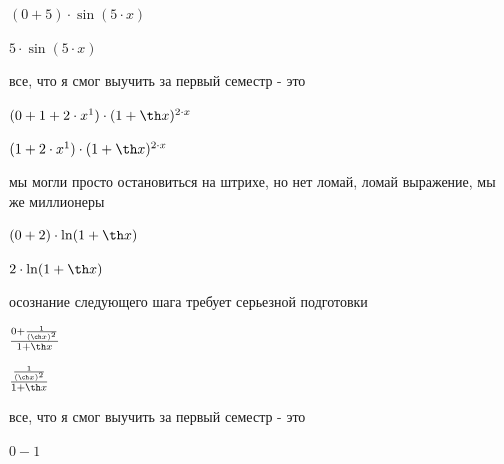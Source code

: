 \documentclass[a4paper,12pt]{article}
\begin{document}
\begin{center}$(0+5) \cdot  \sin (5 \cdot x)$

\end{center}



\begin{center}$5 \cdot  \sin (5 \cdot x)$

\end{center}

все, что я смог выучить за первый семестр - это 



\begin{center}$(0+1+2 \cdot x^{1}) \cdot (1+ \th x)^{2 \cdot x}$

\end{center}



\begin{center}$(1+2 \cdot x^{1}) \cdot (1+ \th x)^{2 \cdot x}$

\end{center}

мы могли просто остановиться на штрихе, но нет ломай, ломай выражение, мы же миллионеры 



\begin{center}$(0+2) \cdot  \ln (1+ \th x)$

\end{center}



\begin{center}$2 \cdot  \ln (1+ \th x)$

\end{center}

осознание следующего шага требует серьезной подготовки 



\begin{center}$ \frac{0+ \frac{1}{( \ch x)^{2}} }{1+ \th x} $

\end{center}



\begin{center}$ \frac{ \frac{1}{( \ch x)^{2}} }{1+ \th x} $

\end{center}

все, что я смог выучить за первый семестр - это 



\begin{center}$0-1$

\end{center}
\end{document}
